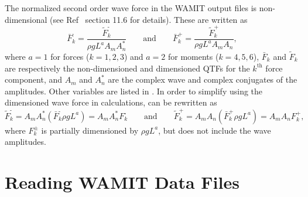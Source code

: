 The normalized second order wave force in the WAMIT output files is non-dimensional (see Ref~\cite{WAMIT} section 11.6 for details).  These are written as
\begin{equation}
   \bar{F}_k^\text{-}   = \frac{\tilde{F}_k^\text{-}}{\rho g L^a A_m A^*_n} 
         \qquad\text{and}\qquad
   \bar{F}_k^{+}        = \frac{\tilde{F}_k^{+}}{\rho g L^a A_m A_n},
\label{eq:QTF:nondimensional}
\end{equation}
where $a=1$ for forces ($k = 1, 2, 3$) and $a=2$ for moments ($k=4, 5, 6$), $\bar{F}_k$ and $\tilde{F}_k$ are respectively the non-dimensioned and dimensioned QTFs for the $k^\text{th}$ force component, 
and $A_m$ and $A^*_n$ are the complex wave and complex conjugates of the amplitudes. Other variables are listed in .
In order to simplify using the dimensioned wave force in calculations,  can be rewritten as
\begin{equation}
    \tilde{F}_k^\text{-}   = A_m A^*_n \left(\bar{F}_k^\text{-}   \rho g L^a\right)    = A_m A^*_n  {F}_k^\text{-} 
         \qquad\text{and}\qquad
     \tilde{F}_k^+         = A_m A_n   \left(\bar{F}_k^+          \rho g L^a\right)    = A_m A_n    {F}_k^+,
\label{eq:QTF:dimensional}
\end{equation}
where ${F}_k^\pm$ is partially dimensioned by $\rho g L^a$, but does not include the wave amplitudes.






\section{Reading WAMIT Data Files}
\label{sec:WamitOuput:Read}

